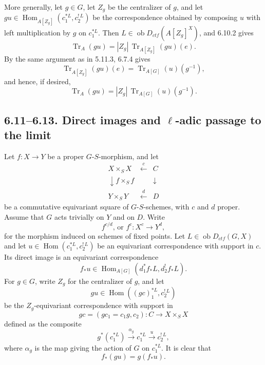 \documentclass[12pt]{article}
\newcommand{\Hom}{\operatorname{Hom}}
\newcommand{\Tr}{\operatorname{Tr}}
\newcommand{\ob}{\operatorname{ob}}
\begin{document}
More generally, let $g\in G$, let $Z_g$ be the centralizer of $g$, and let
$gu\in\Hom_{A[Z_g]}(c_1^{*L},c_2^{!\,L})$ be the correspondence obtained by
composing $u$ with left multiplication by $g$ on $c_1^{*L}$. Then
$L\in\ob D_{ctf}(A[Z_g]^X)$, and 6.10.2 gives
\begin{equation}\tag{6.10.3}
    \Tr_A(gu)=|Z_g|\,\Tr_{A[Z_g]}(gu)(e).
\end{equation}
By the same argument as in 5.11.3, 6.7.4 gives
\begin{equation}\tag{6.10.4}
    \Tr_{A[Z_g]}(gu)(e)=\Tr_{A[G]}(u)(g^{-1}),
\end{equation}
and hence, if desired,
\begin{equation}\tag{6.10.5}
    \Tr_A(gu)=|Z_g|\,\Tr_{A[G]}(u)(g^{-1}).
\end{equation}

\subsection*{6.11--6.13. Direct images and $\ell$-adic passage to the limit}

Let $f:X\to Y$ be a proper $G$-$S$-morphism, and let
\begin{equation}\tag{6.11.1}
\begin{array}{ccc}
X\times_S X & \xleftarrow{\ c\ } & C \\[4pt]
\downarrow\scriptstyle f\times_S f & & \downarrow \\[6pt]
Y\times_S Y & \xleftarrow{\ d\ } & D
\end{array}
\end{equation}
be a commutative equivariant square of $G$-$S$-schemes, with $c$ and $d$ proper.
Assume that $G$ acts trivially on $Y$ and on $D$. Write
\begin{equation}\tag{6.11.2}
       f^{c/d}\text{, or }f^c:X^c\longrightarrow Y^d,
\end{equation}
for the morphism induced on schemes of fixed points. Let
$L\in\ob D_{ctf}(G,X)$ and let
$u\in\Hom(c_1^{*L},c_2^{!\,L})$ be an equivariant correspondence with support in
$c$. Its direct image is an equivariant correspondence
\[
     f_*u\in\Hom_{A[G]}(d_1^{*}f_*L,d_2^{!}f_*L).
\]
For $g\in G$, write $Z_g$ for the centralizer of $g$, and let
\begin{equation}\tag{6.11.3}
      gu\in\Hom((gc)_1^{*L},c_2^{!\,L})
\end{equation}
be the $Z_g$-equivariant correspondence with support in
\begin{equation}\tag{6.11.4}
      gc=(gc_1=c_1g,c_2):C\longrightarrow X\times_S X
\end{equation}
defined as the composite
\[
      g^*(c_1^{*L})\xrightarrow{\alpha_g}c_1^{*L}\xrightarrow{u}c_2^{!\,L},
\]
where $\alpha_g$ is the map giving the action of $G$ on $c_1^{*L}$. It is clear that
\begin{equation}\tag{6.11.5}
      f_*(gu)=g(f_*u).
\end{equation}
\end{document}
